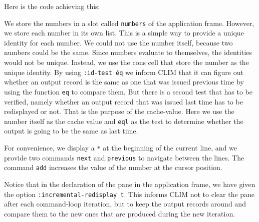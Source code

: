 Here is the code achieving this:



We store the numbers in a slot called \texttt{numbers} of the
application frame.  However, we store each number in its own list.
This is a simple way to provide a unique identity for each number.  We
could not use the number itself, because two numbers could be the
same. Since numbers evaluate to themselves, the identities would not
be unique.  Instead, we use the cons cell that store the number as the
unique identity.  By using \texttt{:id-test \'eq} we inform CLIM that
it can figure out whether an output record is the same as one that was
issued previous time by using the function \texttt{eq} to compare
them.  But there is a second test that has to be verified, namely
whether an output record that was issued last time has to be
redisplayed or not.  That is the purpose of the cache-value.  Here we
use the number itself as the cache value and \texttt{eql} as the test
to determine whether the output is going to be the same as last time.

For convenience, we display a \texttt{*} at the beginning of the
current line, and we provide two commands \texttt{next} and
\texttt{previous} to navigate between the lines. The command
\texttt{add} increases the value of the number at the cursor position.

Notice that in the declaration of the pane in the application frame,
we have given the option \texttt{:incremental-redisplay t}.  This
informs CLIM not to clear the pane after each command-loop iteration,
but to keep the output records around and compare them to the new ones
that are produced during the new iteration.

